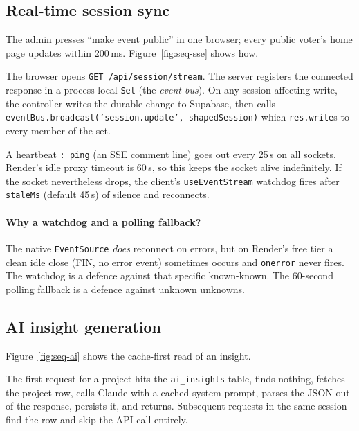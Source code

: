 
\subsection{Real-time session sync}
\label{sub:sse-flow}

The admin presses ``make event public'' in one browser; every public
voter's home page updates within 200\,ms. Figure~\ref{fig:seq-sse}
shows how.


The browser opens \texttt{GET /api/session/stream}. The server registers
the connected response in a process-local \texttt{Set} (the
\emph{event bus}). On any session-affecting write, the controller writes
the durable change to Supabase, then calls
\texttt{eventBus.broadcast('session.update', shapedSession)} which
\texttt{res.write}s to every member of the set.

A heartbeat \texttt{: ping} (an SSE comment line) goes out every 25\,s on
all sockets. Render's idle proxy timeout is 60\,s, so this keeps the
socket alive indefinitely. If the socket nevertheless drops, the
client's \texttt{useEventStream} watchdog fires after \texttt{staleMs}
(default 45\,s) of silence and reconnects.

\paragraph{Why a watchdog and a polling fallback?} The native
\texttt{EventSource} \emph{does} reconnect on errors, but on Render's
free tier a clean idle close (FIN, no error event) sometimes occurs and
\texttt{onerror} never fires. The watchdog is a defence against that
specific known-known. The 60-second polling fallback is a defence
against unknown unknowns.

\subsection{AI insight generation}
\label{sub:ai-flow}

Figure~\ref{fig:seq-ai} shows the cache-first read of an insight.


The first request for a project hits the
\texttt{ai\_insights} table, finds nothing, fetches the project row,
calls Claude with a cached system prompt, parses the JSON out of the
response, persists it, and returns. Subsequent requests in the same
session find the row and skip the API call entirely.


